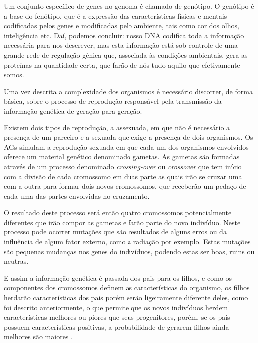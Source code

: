\begin{citacao}
Um conjunto específico de genes no genoma é chamado de genótipo. O
genótipo é a base do fenótipo, que é a expressão das características
físicas e mentais codificadas pelos genes e modificadas pelo
ambiente, tais como cor dos olhos, inteligência etc. Daí, podemos concluir: nosso
DNA codifica toda a informação necessária para nos descrever, mas esta
informação está sob controle de uma grande rede de regulação gênica
que, associada às condições ambientais, gera as proteínas na quantidade
certa, que farão de nós tudo aquilo que efetivamente
somos.
\end{citacao}  

\par Uma vez descrita a complexidade dos organismos é necessário discorrer,
de forma básica, sobre o processo de reprodução responsável pela
transmissão da informação genética de geração para geração.

\par Existem dois tipos de reprodução, a assexuada, em que não é necessário a
presença de um parceiro e a sexuada que exige a presença de dois organismos.
Os AGs simulam a reprodução sexuada em que cada um dos organismos envolvidos
oferece um material genético denominado gametas. As gametas são formadas através de
um processo denominado \textit{crossing-over} ou \textit{crossover} que tem
início com a divisão de cada cromossomo em duas parte as quais 
irão se cruzar uma com a outra para formar dois novos cromossomos, que
receberão um pedaço de cada uma das partes envolvidas no cruzamento.

\par O resultado deste processo será então quatro cromossomos potencialmente
diferentes que irão compor as gametas e farão parte do novo indivíduo. Neste processo
pode ocorrer mutações que são resultados de alguns erros ou da influência
de algum fator externo, como a radiação por exemplo. Estas mutações são
pequenas mudanças nos genes do indivíduos, podendo estas ser boas, ruins ou neutras.


\par E assim a informação genética é passada dos pais para os filhos, e como os
componentes dos cromossomos definem as características do organismo, os filhos
herdarão características dos pais porém serão ligeiramente diferente deles, como
foi descrito anteriormente, o que permite que os novos indivíduos herdem
características melhores ou piores que seus progenitores, porém, se os pais
possuem características positivas, a probabilidade de gerarem filhos ainda
melhores são maiores \cite{livro_ags_ricardo_linden}.

